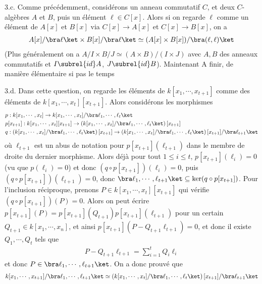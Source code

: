\documentclass[11pt]{article}
\newcommand{\cor}[1]{{\color{red} #1}}
\begin{document}
    \begin{question}{3.c.}
        \label{q3c}
        Comme précédemment, considérons un anneau commutatif $C$, et deux $C$-algèbres $A$ et $B$, puis un élément $\ell \in C[x]$. Alors si on regarde $\ell$ comme un élément de $A[x]$ et $B[x]$ via $C[x] \to A[x]$ et $C[x] \to B[x]$, on a
        \begin{align*}
            A[x]/\bra \ell \ket \times B[x]/\bra \ell \ket \simeq (A[x] \times B[x])/\bra (\ell, \ell) \ket
        \end{align*}
        (Plus généralement on a $A/I \times B/J \simeq (A \times B)/(I \times J)$ avec $A,B$ des anneaux commutatifs et $I \subrel{id} A$, $J \subrel{id} B$). Maintenant \cor{A finir, de manière élémentaire si pas le temps}
    \end{question}
    \begin{question}{3.d.}
        \label{q3d}
        Dans cette question, on regarde les éléments de $k[x_1, \cdots, x_{t+1}]$ comme des éléments de $k[x_1, \cdots, x_t][x_{t+1}]$. Alors considérons les morphismes
        \begin{align*}
            &p : k[x_1, \cdots, x_t] \to k[x_1, \cdots, x_t]/\bra \ell_1, \cdots, \ell_t \ket \\
            &p[x_{t + 1}] : k[x_1, \cdots, x_t][x_{t+1}] \to \left(k[x_1, \cdots, x_t]/\bra \ell_1, \cdots, \ell_t \ket \right)[x_{t+1}] \\
            &q : \left(k[x_1, \cdots, x_t]/\bra \ell_1, \cdots, \ell_t \ket \right)[x_{t+1}] \to \left(k[x_1, \cdots, x_t]/\bra \ell_1, \cdots, \ell_t \ket \right)[x_{t+1}]/\bra \ell_{t + 1} \ket
        \end{align*}
        où $\ell_{t + 1}$ est un abus de notation pour $p[x_{t + 1}](\ell_{t + 1})$ dans le membre de droite du dernier morphisme. Alors déjà pour tout $1 \leq i \leq t$,  $p[x_{t + 1}](\ell_i) = 0$ (vu que $p(\ell_i) = 0$) et donc $(q \circ p[x_{t + 1}])(\ell_i) = 0$, puis $(q \circ p[x_{t + 1}])(\ell_{t + 1}) = 0$, donc $\bra \ell_1, \cdots, \ell_{t + 1} \ket \subseteq \ker (q \circ p[x_{t + 1}])$. Pour l'inclusion réciproque, prenons $P \in k[x_1, \cdots, x_t][x_{t+1}]$ qui vérifie $(q \circ p[x_{t + 1}])(P) = 0$. Alors on peut écrire $p[x_{t + 1}](P) = p[x_{t + 1}](Q_{t + 1})p[x_{t + 1}](\ell_{t + 1})$ pour un certain $Q_{t + 1} \in k[x_1, \cdots, x_n]$, et ainsi $p[x_{t + 1}](P - Q_{t + 1}\ell_{t + 1}) = 0$, et donc il existe $Q_1, \cdots, Q_t$ tels que
        \begin{align*}
            P - Q_{t + 1}\ell_{t + 1} = \sum_{i = 1}^t Q_i\ell_i
        \end{align*}
        et donc $P \in \bra \ell_1, \cdots, \ell_{t + 1} \ket$. On a donc prouvé que
        \begin{align*}
            k[x_1, \cdots, x_{t + 1}]/\bra \ell_1, \cdots, \ell_{t + 1} \ket \simeq \left(k[x_1, \cdots, x_t]/\bra \ell_1, \cdots, \ell_t \ket \right)[x_{t+1}]/\bra \ell_{t + 1} \ket
        \end{align*}
    \end{question}
\end{document}
